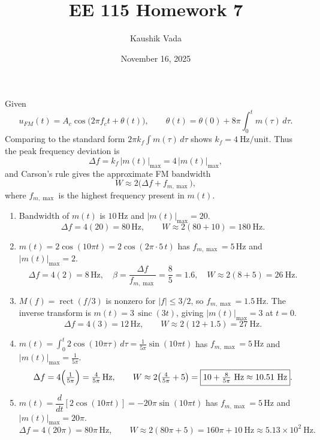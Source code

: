 \documentclass[11pt]{article}
\title{EE 115 Homework 7}
\author{Kaushik Vada}
\date{November 16, 2025}
\begin{document}
\maketitle

Given
\[
u_{FM}(t)=A_c\cos\!\bigl(2\pi f_c t+\theta(t)\bigr),\qquad
\theta(t)=\theta(0)+8\pi\int_0^t m(\tau)\,d\tau.
\]
Comparing to the standard form \(2\pi k_f\int m(\tau)\,d\tau\) shows \(k_f=4\ \text{Hz/unit}\).
Thus the peak frequency deviation is
\[
\Delta f = k_f\,|m(t)|_{\max}=4\,|m(t)|_{\max},
\]
and Carson's rule gives the approximate FM bandwidth
\[
W \approx 2\bigl(\Delta f + f_{m,\max}\bigr),
\]
where \(f_{m,\max}\) is the highest frequency present in \(m(t)\).

\begin{enumerate}
  \item Bandwidth of \(m(t)\) is \(10\,\text{Hz}\) and \(|m(t)|_{\max}=20\).
  \[
  \Delta f = 4(20)=80\,\text{Hz},\qquad
  W \approx 2(80+10)=\boxed{180\ \text{Hz}}.
  \]

  \item \(m(t)=2\cos(10\pi t)=2\cos(2\pi\cdot 5\,t)\) has \(f_{m,\max}=5\,\text{Hz}\) and \(|m(t)|_{\max}=2\).
  \[
  \Delta f = 4(2)=8\,\text{Hz},\quad
  \beta=\frac{\Delta f}{f_{m,\max}}=\frac{8}{5}=1.6,\quad
  W \approx 2(8+5)=\boxed{26\ \text{Hz}}.
  \]

  \item \(M(f)=\operatorname{rect}(f/3)\) is nonzero for \(|f|\le 3/2\), so \(f_{m,\max}=1.5\,\text{Hz}\).
  The inverse transform is \(m(t)=3\,\operatorname{sinc}(3t)\), giving \(|m(t)|_{\max}=3\) at \(t=0\).
  \[
  \Delta f = 4(3)=12\,\text{Hz},\qquad
  W \approx 2(12+1.5)=\boxed{27\ \text{Hz}}.
  \]

  \item \(m(t)=\displaystyle\int_0^t 2\cos(10\pi\tau)\,d\tau=\frac{1}{5\pi}\sin(10\pi t)\)
  has \(f_{m,\max}=5\,\text{Hz}\) and \(|m(t)|_{\max}=\tfrac{1}{5\pi}\).
  \[
  \Delta f = 4\Bigl(\tfrac{1}{5\pi}\Bigr)=\tfrac{4}{5\pi}\,\text{Hz},\qquad
  W \approx 2\!\left(\tfrac{4}{5\pi}+5\right)=\boxed{10+\tfrac{8}{5\pi}\ \text{Hz}\approx 10.51\ \text{Hz}}.
  \]

  \item \(m(t)=\dfrac{d}{dt}[2\cos(10\pi t)]=-20\pi\sin(10\pi t)\) has \(f_{m,\max}=5\,\text{Hz}\) and \(|m(t)|_{\max}=20\pi\).
  \[
  \Delta f = 4(20\pi)=80\pi\,\text{Hz},\qquad
  W \approx 2(80\pi+5)=\boxed{160\pi+10\ \text{Hz}\approx 5.13\times 10^2\ \text{Hz}}.
  \]
\end{enumerate}
\end{document}
